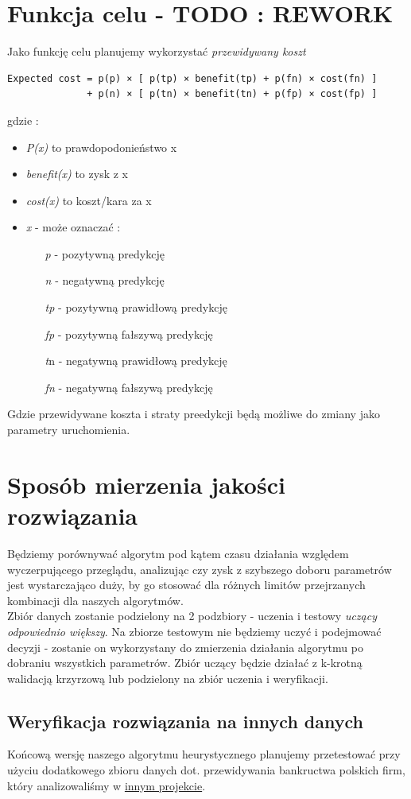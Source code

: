 \documentclass[11pt]{article}
\begin{document}
\section{Funkcja celu - TODO : REWORK}
Jako funkcję celu planujemy wykorzystać \textsl{przewidywany koszt}

\begin{verbatim}
Expected cost = p(p) × [ p(tp) × benefit(tp) + p(fn) × cost(fn) ]
              + p(n) × [ p(tn) × benefit(tn) + p(fp) × cost(fp) ]
\end{verbatim}           
gdzie :
\begin{itemize}
	\item \textsl{P(x)} to prawdopodonieństwo x
	\item \textsl{benefit(x)} to zysk z x
	\item \textsl{cost(x)} to koszt/kara za x
	\item \textsl{x} - może oznaczać :
		\begin{itemize}
			\item[\textit{p} -] pozytywną predykcję
			\item[\textit{n} -] negatywną predykcję
			\item[\textit{tp} -] pozytywną prawidłową predykcję
			\item[\textit{fp} -] pozytywną fałszywą predykcję
			\item[\textit{t}n -] negatywną prawidłową predykcję
			\item[\textit{fn} -] negatywną fałszywą predykcję
		\end{itemize}
\end{itemize}
Gdzie przewidywane koszta i straty preedykcji będą możliwe do zmiany jako parametry uruchomienia.

\section{Sposób mierzenia jakości rozwiązania}
Będziemy porównywać algorytm pod kątem czasu działania względem wyczerpującego przeglądu, analizując czy zysk z szybszego doboru parametrów jest wystarczająco duży, by go stosować dla różnych limitów przejrzanych kombinacji dla naszych algorytmów.
\\
Zbiór danych zostanie podzielony na 2 podzbiory - uczenia i testowy \textsl{uczący odpowiednio większy}. Na zbiorze testowym nie będziemy uczyć i podejmować decyzji - zostanie on wykorzystany do zmierzenia działania algorytmu po dobraniu wszystkich parametrów. Zbiór uczący będzie działać z k-krotną walidacją krzyrzową lub podzielony na zbiór uczenia i weryfikacji.

\subsection{Weryfikacja rozwiązania na innych danych}
Końcową wersję naszego algorytmu heurystycznego planujemy przetestować przy użyciu dodatkowego zbioru danych dot. przewidywania bankructwa polskich firm, który analizowaliśmy w \href{https://github.com/przestaw/Data_Mining_Bancrupcy}{innym projekcie}.
\end{document}
